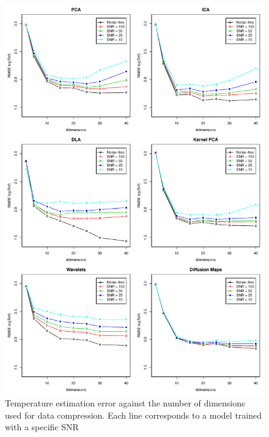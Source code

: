 \documentclass[a4paper,fleqn,usenatbib]{mnras}
\begin{document}
{{{\begin{figure}
\centering\includegraphics[height=0.95\textheight]{flamesHR10_Teff_log_BestSVM_N-SNR-RMSE_test.pdf}
\caption{Temperature estimation error against the number of dimensions
  used for data compression. Each line corresponds to a model trained
  with a specific SNR}
\label{fig:methodsnrTeff}
\end{figure}

}}}
\end{document}
